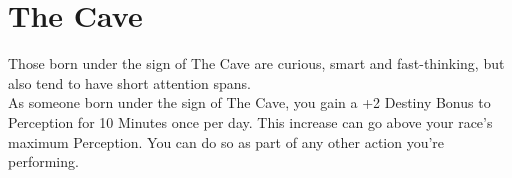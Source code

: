 \section{The Cave}\label{zodiac:cave}

Those born under the sign of The Cave are curious, smart and fast-thinking, but also tend to have short attention spans.\\
As someone born under the sign of The Cave, you gain a +2 Destiny Bonus to Perception for 10 Minutes once per day.
This increase can go above your race's maximum Perception.
You can do so as part of any other action you're performing.\\